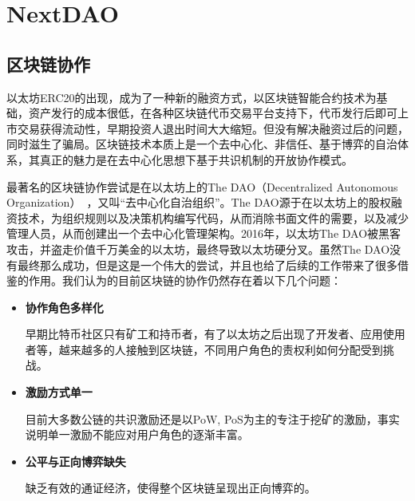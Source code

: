 \section{NextDAO}
\subsection{区块链协作}
以太坊ERC20的出现，成为了一种新的融资方式，以区块链智能合约技术为基础，资产发行的成本很低，在各种区块链代币交易平台支持下，代币发行后即可上市交易获得流动性，早期投资人退出时间大大缩短。但没有解决融资过后的问题，同时滋生了骗局。区块链技术本质上是一个去中心化、非信任、基于博弈的自治体系，其真正的魅力是在去中心化思想下基于共识机制的开放协作模式。

最著名的区块链协作尝试是在以太坊上的The DAO（Decentralized Autonomous Organization）~\cite{DAO}，又叫“去中心化自治组织”。The DAO源于在以太坊上的股权融资技术，为组织规则以及决策机构编写代码，从而消除书面文件的需要，以及减少管理人员，从而创建出一个去中心化管理架构。2016年，以太坊The DAO被黑客攻击，并盗走价值千万美金的以太坊，最终导致以太坊硬分叉。虽然The DAO没有最终那么成功，但是这是一个伟大的尝试，并且也给了后续的工作带来了很多借鉴的作用。我们认为的目前区块链的协作仍然存在着以下几个问题：

\begin{itemize}
	\item \textbf{协作角色多样化}

	早期比特币社区只有矿工和持币者，有了以太坊之后出现了开发者、应用使用者等，越来越多的人接触到区块链，不同用户角色的责权利如何分配受到挑战。

	\item \textbf{激励方式单一}

	目前大多数公链的共识激励还是以PoW, PoS为主的专注于挖矿的激励，事实说明单一激励不能应对用户角色的逐渐丰富。

	\item \textbf{公平与正向博弈缺失}

	缺乏有效的通证经济，使得整个区块链呈现出正向博弈的。

\end{itemize}

